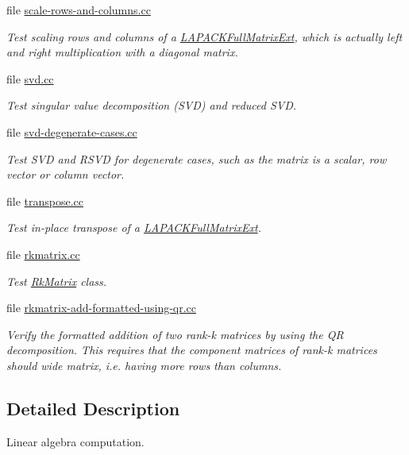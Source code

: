 \begin{DoxyCompactItemize}
file \hyperlink{scale-rows-and-columns_8cc}{scale-\/rows-\/and-\/columns.\+cc}
\begin{DoxyCompactList}\small\item\em Test scaling rows and columns of a \hyperlink{classLAPACKFullMatrixExt}{L\+A\+P\+A\+C\+K\+Full\+Matrix\+Ext}, which is actually left and right multiplication with a diagonal matrix. \end{DoxyCompactList}\item 
file \hyperlink{svd_8cc}{svd.\+cc}
\begin{DoxyCompactList}\small\item\em Test singular value decomposition (S\+VD) and reduced S\+VD. \end{DoxyCompactList}\item 
file \hyperlink{svd-degenerate-cases_8cc}{svd-\/degenerate-\/cases.\+cc}
\begin{DoxyCompactList}\small\item\em Test S\+VD and R\+S\+VD for degenerate cases, such as the matrix is a scalar, row vector or column vector. \end{DoxyCompactList}\item 
file \hyperlink{transpose_8cc}{transpose.\+cc}
\begin{DoxyCompactList}\small\item\em Test in-\/place transpose of a \hyperlink{classLAPACKFullMatrixExt}{L\+A\+P\+A\+C\+K\+Full\+Matrix\+Ext}. \end{DoxyCompactList}\item 
file \hyperlink{rkmatrix_8cc}{rkmatrix.\+cc}
\begin{DoxyCompactList}\small\item\em Test \hyperlink{classRkMatrix}{Rk\+Matrix} class. \end{DoxyCompactList}\item 
file \hyperlink{rkmatrix-add-formatted-using-qr_8cc}{rkmatrix-\/add-\/formatted-\/using-\/qr.\+cc}
\begin{DoxyCompactList}\small\item\em Verify the formatted addition of two rank-\/k matrices by using the QR decomposition. This requires that the component matrices of rank-\/k matrices should wide matrix, i.\+e. having more rows than columns. \end{DoxyCompactList}\end{DoxyCompactItemize}


\subsection{Detailed Description}
Linear algebra computation. 


